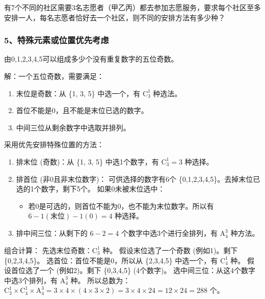 \begin{example}
    有7个不同的社区需要3名志愿者（甲乙丙）都去参加志愿服务，要求每个社区至多安排一人，每名志愿者恰好去一个社区，则不同的安排方法有多少种？
\end{example}

\subsubsection{5、特殊元素或位置优先考虑}
\begin{example}
    由0,1,2,3,4,5可以组成多少个没有重复数字的五位奇数。
\end{example}
\begin{solution}
    解：一个五位奇数，需要满足：
    \begin{enumerate}
        \item 末位是奇数：从 \{1, 3, 5\} 中选一个，有 $\mathrm{C}_{3}^{1}$ 种选法。
        \item 首位不能是0，且不能是末位已选的数字。
        \item 中间三位从剩余数字中选取并排列。
    \end{enumerate}
    采用优先安排特殊位置的方法：
    \begin{enumerate}
        \item 排末位 (奇数)：从 \{1, 3, 5\} 中选1个数字，有 $\mathrm{C}_{3}^{1} = 3$ 种选择。
        \item 排首位 (非0且非末位数字)：
              可供选择的数字有6个 \{0,1,2,3,4,5\}。去掉末位已选的1个数字，剩下5个。
              如果0未被末位选中：
              \begin{itemize}
                  \item 若0是可选的，则首位不能为0，也不能为末位数字。所以有 $6-1(\text{末位})-1(0) = 4$ 种选择。
              \end{itemize}
        \item 排中间三位：从剩下的 $6-2=4$ 个数字中选3个进行全排列，有 $\mathrm{A}_{4}^{3}$ 种方法。
    \end{enumerate}
    组合计算：
    先选末位奇数：$\mathrm{C}_{3}^{1}$ 种。
    假设末位选了一个奇数 (例如1)。剩下 \{0,2,3,4,5\}。
    选首位：首位不能是0，所以从 \{2,3,4,5\} 中选一个，有 $\mathrm{C}_{4}^{1}$ 种。
    假设首位选了一个 (例如2)。剩下 \{0,3,4,5\} (4个数字)。
    选中间三位：从这4个数字中选3个排列，有 $\mathrm{A}_{4}^{3}$ 种。
    所以总数为：$\mathrm{C}_{3}^{1} \times \mathrm{C}_{4}^{1} \times \mathrm{A}_{4}^{3} = 3 \times 4 \times (4 \times 3 \times 2) = 3 \times 4 \times 24 = 12 \times 24 = 288$ 个。
\end{solution}

